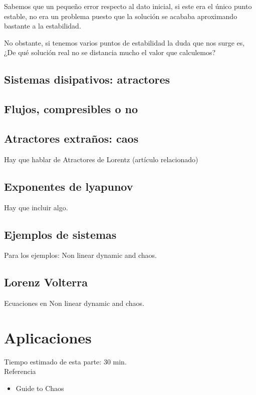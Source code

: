 Sabemos que un pequeño error respecto al dato inicial, si este era el único punto estable, no era un problema puesto que la solución se acababa aproximando bastante a la estabilidad.

No obstante, si tenemos varios puntos de estabilidad la duda que nos surge es, ¿De qué solución real no se distancia mucho el valor que calculemos?

\subsection{Sistemas disipativos: atractores}
\subsection{Flujos, compresibles o no}
\subsection{Atractores extraños: caos}
Hay que hablar de Atractores de Lorentz (artículo relacionado)
\subsection{Exponentes de lyapunov}
Hay que incluir algo.
\subsection{Ejemplos de sistemas}
Para los ejemplos: Non linear dynamic and chaos.
\subsection{Lorenz Volterra}
Ecuaciones en Non linear dynamic and chaos.


\section{Aplicaciones}
Tiempo estimado de esta parte: 30 min.\\
Referencia
\begin{itemize}
\item Guide to Chaos
\end{itemize}
